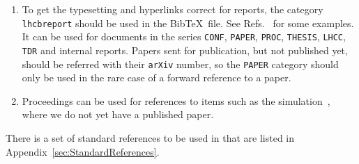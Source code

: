 \begin{enumerate}
\item To get the typesetting and hyperlinks correct for \lhcb reports,
  the category \texttt{lhcbreport} should be used in the Bib\TeX\
  file. See Refs.~\cite{LHCb-INT-2011-047, *LHCb-ANA-2011-078,
    *CERN-THESIS-2014-057, *LHCb-PROC-2014-017, *LHCB-TALK-2014-257}
  for some examples. It can be used for \lhcb documents in the series
  \texttt{CONF}, \texttt{PAPER}, \texttt{PROC}, \texttt{THESIS},
  \texttt{LHCC}, \texttt{TDR} and internal \lhcb reports. Papers sent
  for publication, but not published yet, should be referred with
  their \texttt{arXiv} number, so the \texttt{PAPER} category should
  only be used in the rare case of a forward reference to a paper.

\item Proceedings can be used for references to items such as the
  \lhcb simulation~\cite{LHCb-PROC-2011-006}, where we do not yet have
  a published paper.

\end{enumerate}

There is a set of standard references to be used in \lhcb that are
listed in Appendix~\ref{sec:StandardReferences}.
